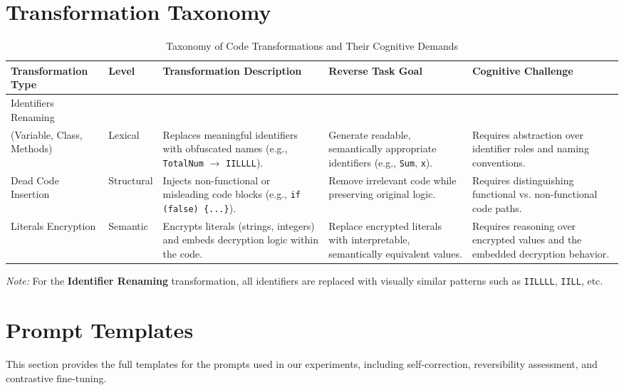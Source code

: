 \section{Transformation Taxonomy}
\label{appendix:taxonomy}

\begin{table}[htbp]
\centering
\caption{Taxonomy of Code Transformations and Their Cognitive Demands}
\label{tab:transformation_taxonomy}
\begin{adjustbox}{width=.75\linewidth,center}
\begin{tabularx}{\textwidth}{@{}l|l|X|X|X@{}}
\toprule
\textbf{Transformation Type} & \textbf{Level} & \textbf{Transformation Description} & \textbf{Reverse Task Goal} & \textbf{Cognitive Challenge} \\ \midrule
Identifiers Renaming\\(Variable, Class, Methods) & Lexical & Replaces meaningful identifiers with obfuscated names (e.g., \texttt{TotalNum} $\rightarrow$ \texttt{IILLLL}). & Generate readable, semantically appropriate identifiers (e.g., \texttt{Sum}, \texttt{x}). & Requires abstraction over identifier roles and naming conventions. \\ \addlinespace
Dead Code Insertion & Structural & Injects non-functional or misleading code blocks (e.g., \texttt{if (false) \{...\}}). & Remove irrelevant code while preserving original logic. & Requires distinguishing functional vs. non-functional code paths. \\ \addlinespace
Literals Encryption & Semantic & Encrypts literals (strings, integers) and embeds decryption logic within the code. & Replace encrypted literals with interpretable, semantically equivalent values. & Requires reasoning over encrypted values and the embedded decryption behavior. \\ \bottomrule
\end{tabularx}
\end{adjustbox}
\noindent\textit{Note:} For the \textbf{Identifier Renaming} transformation, all identifiers are replaced with visually similar patterns such as \texttt{IILLLL}, \texttt{IILL}, etc.
\end{table}

\section{Prompt Templates}
\label{appendix:prompts}
This section provides the full templates for the prompts used in our experiments, including self-correction, reversibility assessment, and contrastive fine-tuning.

